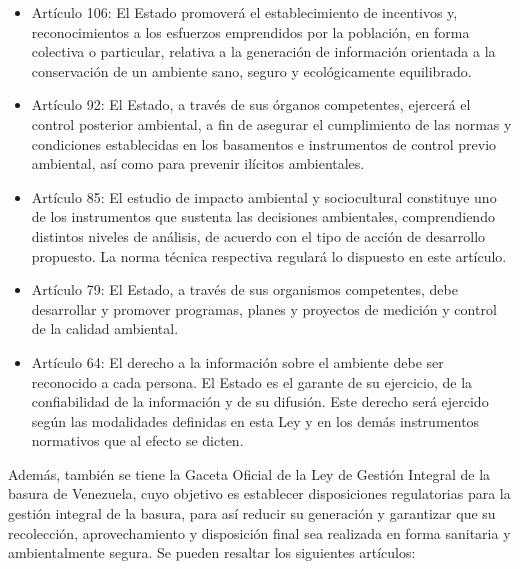 \begin{itemize}
    \item Artículo 106: El Estado promoverá el establecimiento de incentivos y, reconocimientos a los esfuerzos emprendidos por la población, en forma colectiva o particular, relativa a la generación de información orientada a la conservación de un ambiente sano, seguro y ecológicamente equilibrado.
    
    \item Artículo 92: El Estado, a través de sus órganos competentes, ejercerá el control posterior ambiental, a fin de asegurar el cumplimiento de las normas y condiciones establecidas en los basamentos e instrumentos de control previo ambiental, así como para prevenir ilícitos ambientales.
    
    \item Artículo 85: El estudio de impacto ambiental y sociocultural constituye uno de los instrumentos que sustenta las decisiones ambientales, comprendiendo distintos niveles de análisis, de acuerdo con el tipo de acción de desarrollo propuesto. La norma técnica respectiva regulará lo dispuesto en este artículo.
    
    \item Artículo 79: El Estado, a través de sus organismos competentes, debe desarrollar y promover programas, planes y proyectos de medición y control de la calidad ambiental.
    
    \item Artículo 64: El derecho a la información sobre el ambiente debe ser reconocido a cada persona. El Estado es el garante de su ejercicio, de la confiabilidad de la información y de su difusión. Este derecho será ejercido según las modalidades definidas en esta Ley y en los demás instrumentos normativos que al efecto se dicten.
\end{itemize}

Además, también se tiene la Gaceta Oficial de la Ley de Gestión Integral de la basura de Venezuela, cuyo objetivo es establecer disposiciones regulatorias para la gestión integral de la basura, para así reducir su generación y garantizar que su recolección, aprovechamiento y disposición final sea realizada en forma sanitaria y ambientalmente segura. Se pueden resaltar los siguientes artículos:

